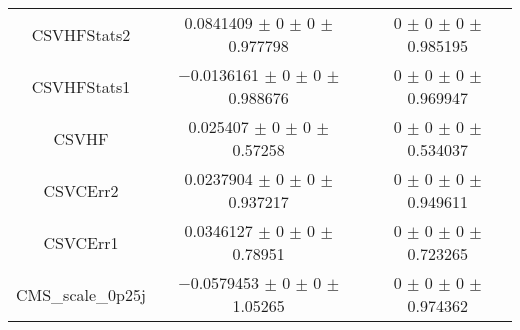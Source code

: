 \begin{table}
\begin{tabular}{ccc}
CSVHFStats2 	& \num{0.0841409} $\pm$ \num{0} $\pm$ \num{0} $\pm$ \num{0.977798} 	& \num{0} $\pm$ \num{0} $\pm$ \num{0} $\pm$ \num{0.985195}\\
CSVHFStats1 	& \num{-0.0136161} $\pm$ \num{0} $\pm$ \num{0} $\pm$ \num{0.988676} 	& \num{0} $\pm$ \num{0} $\pm$ \num{0} $\pm$ \num{0.969947}\\
CSVHF 	& \num{0.025407} $\pm$ \num{0} $\pm$ \num{0} $\pm$ \num{0.57258} 	& \num{0} $\pm$ \num{0} $\pm$ \num{0} $\pm$ \num{0.534037}\\
CSVCErr2 	& \num{0.0237904} $\pm$ \num{0} $\pm$ \num{0} $\pm$ \num{0.937217} 	& \num{0} $\pm$ \num{0} $\pm$ \num{0} $\pm$ \num{0.949611}\\
CSVCErr1 	& \num{0.0346127} $\pm$ \num{0} $\pm$ \num{0} $\pm$ \num{0.78951} 	& \num{0} $\pm$ \num{0} $\pm$ \num{0} $\pm$ \num{0.723265}\\
CMS\_scale\_0p25j 	& \num{-0.0579453} $\pm$ \num{0} $\pm$ \num{0} $\pm$ \num{1.05265} 	& \num{0} $\pm$ \num{0} $\pm$ \num{0} $\pm$ \num{0.974362}\\
\bottomrule
\end{tabular}
\end{table}